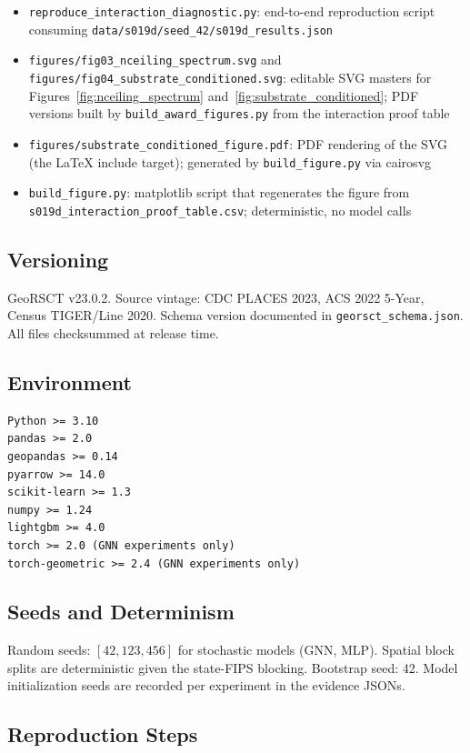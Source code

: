 \documentclass{article}
\begin{document}
\begin{itemize}
\item \texttt{reproduce\_interaction\_diagnostic.py}: end-to-end reproduction script consuming \texttt{data/s019d/seed\_42/s019d\_results.json}
\item \texttt{figures/fig03\_nceiling\_spectrum.svg} and \texttt{figures/fig04\_substrate\_conditioned.svg}: editable SVG masters for Figures~\ref{fig:nceiling_spectrum} and~\ref{fig:substrate_conditioned}; PDF versions built by \texttt{build\_award\_figures.py} from the interaction proof table
\item \texttt{figures/substrate\_conditioned\_figure.pdf}: PDF rendering of the SVG (the LaTeX include target); generated by \texttt{build\_figure.py} via cairosvg
\item \texttt{build\_figure.py}: matplotlib script that regenerates the figure from \texttt{s019d\_interaction\_proof\_table.csv}; deterministic, no model calls
\end{itemize}

\subsection{Versioning}

GeoRSCT v23.0.2. Source vintage: CDC PLACES 2023, ACS 2022 5-Year, Census TIGER/Line 2020. Schema version documented in \texttt{georsct\_schema.json}. All files checksummed at release time.

\subsection{Environment}

\begin{verbatim}
Python >= 3.10
pandas >= 2.0
geopandas >= 0.14
pyarrow >= 14.0
scikit-learn >= 1.3
numpy >= 1.24
lightgbm >= 4.0
torch >= 2.0 (GNN experiments only)
torch-geometric >= 2.4 (GNN experiments only)
\end{verbatim}

\subsection{Seeds and Determinism}

Random seeds: $[42, 123, 456]$ for stochastic models (GNN, MLP). Spatial block splits are deterministic given the state-FIPS blocking. Bootstrap seed: 42. Model initialization seeds are recorded per experiment in the evidence JSONs.

\subsection{Reproduction Steps}
\end{document}
